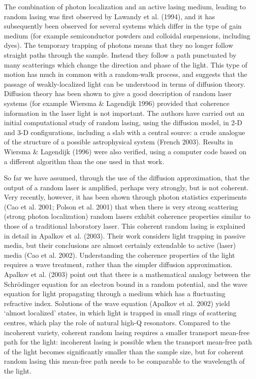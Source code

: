 The combination of photon localization and an active lasing medium, leading to
random lasing was first observed by Lawandy et al. (1994), and it has 
subsequently been observed for several systems which differ in the type of
gain medium (for example semiconductor powders and colloidal suspensions,
including dyes). 
The temporary trapping of photons means that they no longer follow straight
paths through the sample. Instead they follow a path punctuated by many
scatterings which change the direction and phase of the light. This type
of motion has much in common with a random-walk process, and suggests that
the passage of weakly-localized light can be understood in terms of
diffusion theory. Diffusion theory has been shown to give a good description
of random laser systems (for example Wiersma \& Lagendijk 1996) provided
that coherence information in the laser light is not important. The authors
have carried out an initial computational
study of random lasing, using the diffusion
model, in 2-D and 3-D configurations, including a slab with a central source:
a crude analogue of the structure of a possible astrophysical system
(French 2003). Results in Wiersma \& Lagendijk (1996) were also verified, using
a computer code based on a different algorithm than the one used in that work.

So far we have assumed, through the use of the diffusion approximation, that
the output of a random laser is amplified, perhaps very strongly, but is
not coherent. Very recently, however, it has been shown through photon
statistics experiments (Cao et al. 2001; Polson et al. 2001) that when there is very strong scattering (strong
photon localization) random lasers exhibit coherence properties similar to
those of a traditional laboratory laser. This coherent random lasing is
explained in detail in Apalkov et al. (2003). Their work considers light
trapping in passive media, but their conclusions are almost certainly
extendable to active (laser) media (Cao et al. 2002).
Understanding the coherence
properties of the light requires a wave treatment, rather than the simpler
diffusion approximation. Apalkov et al. (2003) point out that there is a
mathematical
analogy between the Schr\"{o}dinger equation for an electron bound in a
random potential, and the wave equation for light propagating through a medium
which has a fluctuating refractive index. Solutions of the wave equation
(Apalkov et al. 2002)
yield `almost localized' states, in which light is trapped in small rings
of scattering centres, which play the role of natural high-Q resonators.
Compared to the incoherent variety,
coherent random lasing requires a smaller transport mean-free path for the
light: incoherent lasing is possible when the transport
mean-free path of the light becomes
significantly smaller than the sample size, but for coherent random lasing
this mean-free path needs to be comparable to the wavelength of the light.

